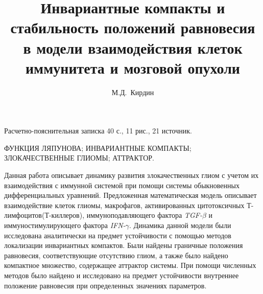 \documentclass[14pt,a4paper]{extarticle}
\title{Инвариантные компакты и стабильность положений равновесия в модели взаимодействия клеток иммунитета и мозговой опухоли}
\author{М.Д.~Кирдин}
\begin{document}
	\maketitle
	
	\begin{annotation}
	
	Расчетно-пояснительная записка 40 с., 11 рис., 21  источник.
	
	\MakeUppercase{функция Ляпунова; инвариантные компакты; злокачественные глиомы; аттрактор.}
	
	Данная работа описывает динамику развития злокачественных глиом с учетом их взаимодействия с иммунной системой при помощи системы обыкновенных дифференциальных уравнений. Предложенная математическая модель описывает взаимодействие клеток глиомы, макрофагов, активированных цитотоксичных Т-лимфоцитов(Т-киллеров), иммуноподавляющего фактора \textit{TGF-}$\beta$ и иммуностимулирующего фактора \textit{IFN-}$\gamma$. Динамика данной модели были исследована аналитически на предмет устойчивости с помощью методов локализации инвариантных компактов. Были найдены граничные положения равновесия, соответствующие отсутствию глиом, а также было найдено компактное множество, содержащее аттрактор системы. При помощи численных методов было найдено и исследовано на предмет устойчивости внутреннее положение равновесия при определенных значениях параметров.
	
	\end{annotation}
	
	\tableofcontents
	
\end{document}
